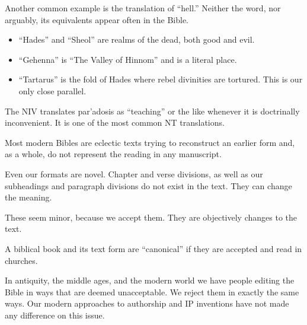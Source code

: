 \documentclass{beamer}
\begin{document}
\begin{frame}
  Another common example is the translation of ``hell.''
  Neither the word, nor arguably, its equivalents appear often in the Bible.\pause
  \begin{itemize}
	\item ``Hades'' and ``Sheol'' are realms of the dead, both good and evil.\pause
	\item ``Gehenna'' is ``The Valley of Hinnom'' and is a literal place.\pause
	\item ``Tartarus'' is the fold of Hades where rebel divinities are tortured.
	  This is our only close parallel.
  \end{itemize}
\end{frame}

\begin{frame}
  The NIV translates \textgreek{par'adosis} as ``teaching'' or the like whenever it is doctrinally inconvenient.
  It is one of the most common NT translations.
\end{frame}

\begin{frame}
  Most modern Bibles are eclectic texts trying to reconstruct an earlier form and, as a whole, do not represent the reading in any manuscript.
\end{frame}

\begin{frame}
  Even our formats are novel.
  Chapter and verse divisions, as well as our subheadings and paragraph divisions do not exist in the text.
  They can change the meaning.
\end{frame}

\begin{frame}
  These seem minor, because we accept them.
  They are objectively changes to the text.
\end{frame}

\begin{frame}
  A biblical book and its text form are ``canonical'' if they are accepted and read in churches.
\end{frame}

\begin{frame}
  In antiquity, the middle ages, and the modern world we have people editing the Bible in ways that are deemed unacceptable.
  We reject them in exactly the same ways.
  Our modern approaches to authorship and IP inventions have not made any difference on this issue.
\end{frame}
\end{document}
